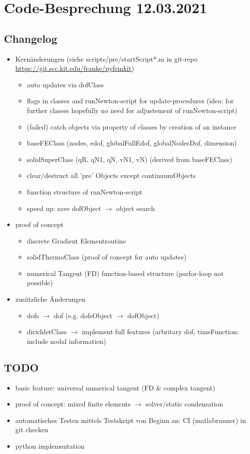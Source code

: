 \documentclass{scrarticle}
\begin{document}
\section*{Code-Besprechung 12.03.2021}
\subsection*{Changelog}
\begin{itemize}
\item Kern\"anderungen (siehe scripts/pre/startScript*.m in git-repo \url{https://git.scc.kit.edu/franke/pyfemkit})
  \begin{itemize}
  \item auto updates via dofClass
  \item flags in classes and runNewton-script for update-procedures (idea: for further classes hopefully no need for adjustement of runNewton-script)
  \item (failed) catch objects via property of classes by creation of an instance
  \item baseFEClass (nodes, edof, globalFullEdof, globalNodesDof, dimension)
  \item solidSuperClass (qR, qN1, qN, vN1, vN) (derived from baseFEClass)
  \item clear/destruct all 'pre' Objects except continuumObjects
  \item function structure of runNewton-script
  \item speed up: save dofObject \(\rightarrow\) object search
\end{itemize}
\item proof of concept    
\begin{itemize}
  \item discrete Gradient Elementroutine
  \item solidThermoClass (proof of concept for auto updates)
  \item numerical Tangent (FD) function-based structure (parfor-loop not possible)
\end{itemize}
\item zus\"atzliche \"Anderungen
\begin{itemize}
    \item dofs \(\rightarrow\) dof (e.g. dofsObject \(\rightarrow\) dofObject)
  \item dirichletClass \(\rightarrow\) implement full features (arbritary dof, timeFunction: include nodal information)
\end{itemize}
\end{itemize}
\subsection*{TODO}
\begin{itemize}
  \item basic feature: universal numerical tangent (FD \& complex tangent)
  \item proof of concept: mixed finite elements \(\rightarrow\) solver/static condensation
 \item automatisches Testen mittels Testskript von Beginn an: CI (matlabrunner) in git checken
 \item python implementation 
\end{itemize}
\end{document}
